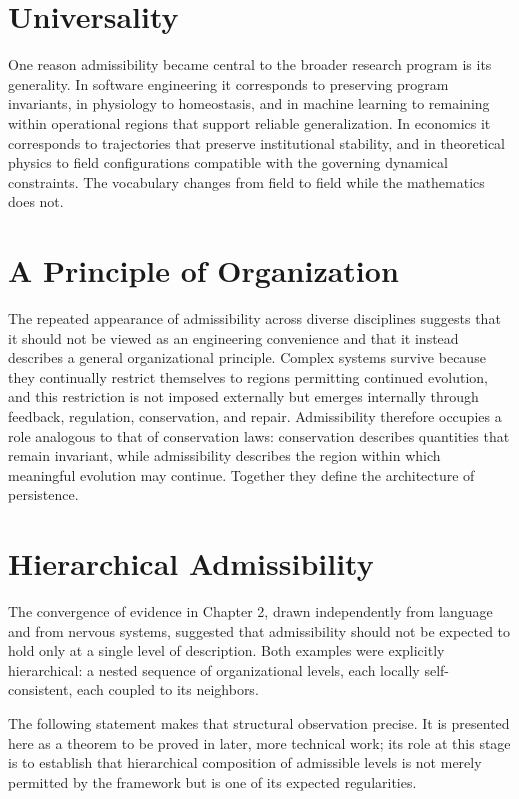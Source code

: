 \documentclass[11pt,oneside]{book}
\numberwithin{equation}{chapter}
\theoremstyle{definition}
\theoremstyle{plain}
\begin{document}
\section{Universality}

One reason admissibility became central to the broader research program is its generality. In software engineering it corresponds to preserving program invariants, in physiology to homeostasis, and in machine learning to remaining within operational regions that support reliable generalization. In economics it corresponds to trajectories that preserve institutional stability, and in theoretical physics to field configurations compatible with the governing dynamical constraints. The vocabulary changes from field to field while the mathematics does not.

\section{A Principle of Organization}

The repeated appearance of admissibility across diverse disciplines suggests that it should not be viewed as an engineering convenience and that it instead describes a general organizational principle. Complex systems survive because they continually restrict themselves to regions permitting continued evolution, and this restriction is not imposed externally but emerges internally through feedback, regulation, conservation, and repair. Admissibility therefore occupies a role analogous to that of conservation laws: conservation describes quantities that remain invariant, while admissibility describes the region within which meaningful evolution may continue. Together they define the architecture of persistence.

\section{Hierarchical Admissibility}

The convergence of evidence in Chapter 2, drawn independently from language
and from nervous systems, suggested that admissibility should not be
expected to hold only at a single level of description. Both examples were
explicitly hierarchical: a nested sequence of organizational levels, each
locally self-consistent, each coupled to its neighbors.

The following statement makes that structural observation precise. It is
presented here as a theorem to be proved in later, more technical work; its
role at this stage is to establish that hierarchical composition of
admissible levels is not merely permitted by the framework but is one of its
expected regularities.
\end{document}
